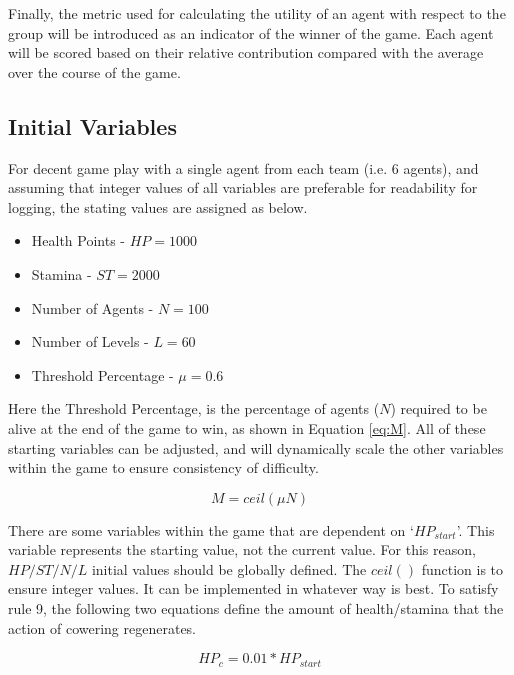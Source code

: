 Finally, the metric used for calculating the utility of an agent with respect to the group will be introduced as an indicator of the winner of the game. Each agent will be scored based on their relative contribution compared with the average over the course of the game. 

\subsection{Initial Variables}\label{sec: initial variable}

For decent game play with a single agent from each team (i.e. 6 agents), and assuming that integer values of all variables are preferable for readability for logging, the stating values are assigned as below. 

\begin{itemize}
    \item Health Points - $HP = 1000$
    \item Stamina - $ST = 2000$
    \item Number of Agents - $N = 100$
    \item Number of Levels - $L = 60$
    \item Threshold Percentage - $\mu = 0.6$
\end{itemize}

Here the Threshold Percentage, is the percentage of agents ($N$) required to be alive at the end of the game to win, as shown in Equation \ref{eq:M}. All of these starting variables can be adjusted, and will dynamically scale the other variables within the game to ensure consistency of difficulty. 

\begin{equation}\label{eq:M}
    M = ceil(\mu N)
\end{equation}

There are some variables within the game that are dependent on `$HP_{start}$'. This variable represents the starting value, not the current value. For this reason, $HP/ST/N/L$ initial values should be globally defined. The $ceil()$ function is to ensure integer values. It can be implemented in whatever way is best. To satisfy rule 9, the following two equations define the amount of health/stamina that the action of cowering regenerates.  

\begin{equation}
    HP_c = 0.01*HP_{start}
\end{equation}

